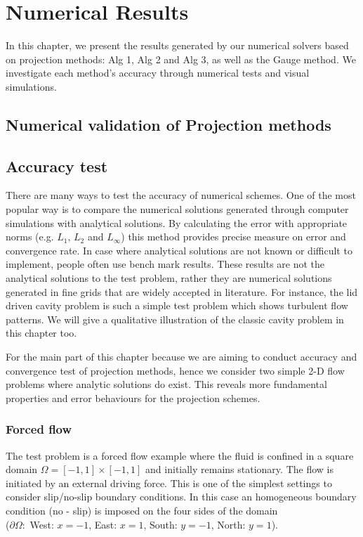 \chapter{Numerical Results}
\label{chapter 6}
In this chapter, we present the results generated by our numerical solvers based on projection methods: Alg 1, Alg 2 and Alg 3, as well as the Gauge method. We investigate each method's accuracy through numerical tests and visual simulations.

\section*{Numerical validation of Projection methods}
\section{Accuracy test}
There are many ways to test the accuracy of numerical schemes. One of the most popular way is to compare the numerical solutions generated through computer simulations with analytical solutions. By calculating the error with appropriate norms (e.g. $L_1,\,L_2$ and $L_\infty$) this method provides precise measure on error and convergence rate. In case where analytical solutions are not known or difficult to implement, people often use bench mark results. These results are not the analytical solutions to the test problem, rather they are numerical solutions generated in fine grids that are widely accepted in literature. For instance, the lid driven cavity problem is such a simple test problem which shows turbulent flow patterns. We will give a qualitative illustration of the classic cavity problem in this chapter too.

For the main part of this chapter because we are aiming to conduct accuracy and convergence test of projection methods, hence we consider two simple 2-D flow problems where analytic solutions do exist. This reveals more fundamental properties and error behaviours for the projection schemes.\\

\subsection{Forced flow}
The test problem is a forced flow example where the fluid is confined in a square domain $\Omega = [-1,1] \times [-1,1]$ and initially remains stationary. The flow is initiated by an external driving force. This is one of the simplest settings to consider slip/no-slip boundary conditions. In this case an homogeneous boundary condition (no - slip) is imposed on the four sides of the domain \\
($\partial \Omega:$ West: $x = -1$, East: $x=1$, South: $y = -1$, North: $y=1$).\\

